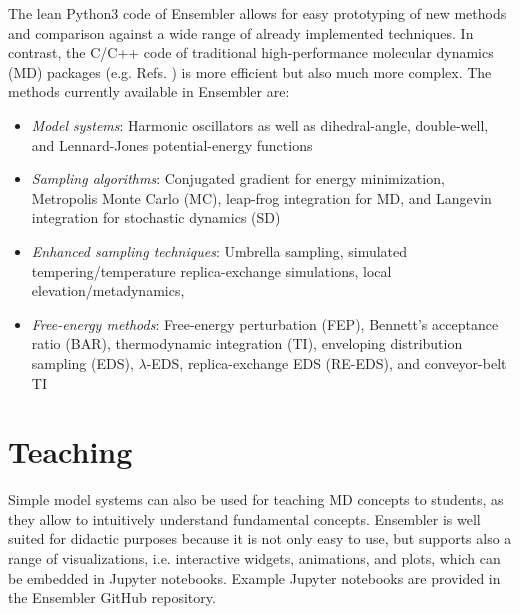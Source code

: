 The lean Python3 code\cite{VanRossum2009} of Ensembler allows for easy prototyping of new methods and comparison against a wide range of already implemented techniques. 
In contrast, the C/C++\cite{Stroustrup1995} code of traditional high-performance molecular dynamics (MD) packages (e.g. Refs. \cite{Berendsen1995,Lindahl2001a,VanDerSpoel2005,Eastman2017,Brooks2009}) is more efficient but also much more complex. 
%
The methods currently available in Ensembler are:
\begin{itemize}
	\item \textit{Model systems}: Harmonic oscillators as well as dihedral-angle, double-well, and Lennard-Jones potential-energy functions\cite{Jones1924}
	\item \textit{Sampling algorithms}: Conjugated gradient\cite{Hestenes1952} for energy minimization, Metropolis Monte Carlo (MC),\cite{Hastings1970} leap-frog integration\cite{VanGunsteren1988} for MD, and Langevin integration\cite{Brunger1984} for stochastic dynamics (SD)
	\item \textit{Enhanced sampling techniques}: Umbrella sampling,\cite{Valleau1977} simulated tempering/temperature replica-exchange simulations,\cite{Sugita1999} local elevation/metadynamics,\cite{Huber1994, Laio2002}
	\item \textit{Free-energy methods}: Free-energy perturbation (FEP),\cite{Zwanzig1954} Bennett's acceptance ratio (BAR),\cite{Bennett1976} thermodynamic integration (TI),\cite{Kirkwood1935} enveloping distribution sampling (EDS),\cite{Christ2007, Christ2008a, Christ2009} $\lambda$-EDS,\cite{Koenig2020} replica-exchange EDS (RE-EDS),\cite{Sidler2016a} and conveyor-belt TI\cite{Hahn2019}
\end{itemize}

\section{Teaching}

Simple model systems can also be used for teaching MD concepts to students, as they allow to intuitively understand fundamental concepts. \cite{Pohorille2010} 
Ensembler is well suited for didactic purposes because it is not only easy to use, but supports also a range of visualizations, i.e. interactive widgets, animations, and plots, which can be embedded in Jupyter notebooks.\cite{Kluyver2016}
Example Jupyter notebooks\cite{Kluyver2016} are provided in the Ensembler GitHub repository.